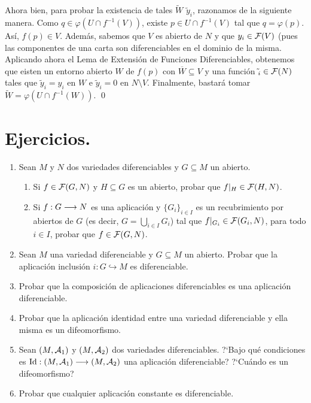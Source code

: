 \documentclass[cursovd_portada.tex]{subfiles}
\begin{document}
\begin{dem}
Ahora bien, para probar la existencia de tales $\tilde{W}$  $\tilde{y}_i$, razonamos de la siguiente manera. Como $q \in φ(U \cap f^{-1}(V))$, existe $p \in U \cap f^{-1}(V)$ tal que $q = φ(p)$. Así, $f(p) \in V$. Además, sabemos que $V$ es abierto de $N$ y que $y_i \in {\cal F}(V)$ (pues las componentes de una carta son diferenciables en el dominio de la misma. Aplicando ahora el Lema de Extensión de Funciones Diferenciables, obtenemos que eisten un entorno abierto $W$ de $f(p)$ con $\overline{W} \subseteq V$ y una función $\tilde{}_i \in {\cal F}(N)$ tales que $\tilde{y}_i = y_i$ en $W$ e $\tilde{y}_i = 0$ en $N \setminus V$. Finalmente, bastará tomar $\tilde{W} = φ(U \cap f^{-1}(W))$.
\qed
\end{dem}
\section{Ejercicios.}
\begin{enumerate}
\item Sean $M$ y $N$ dos variedades diferenciables y $G\subseteq M$ un abierto.
\begin{enumerate}
\item Si $f\in{\cal F}(G,N)$ y $H\subseteq G$ es un abierto, probar que $f|_H\in{\cal F}(H,N)$.
\item Si $f:G\longrightarrow N$ es una aplicación y $\{G_i\}_{i\in I}$ es un recubrimiento por abiertos de $G$ (es decir,
$G=\bigcup_{i\in I}G_i$) tal que $f|_{G_i}\in{\cal F}(G_i,N)$, para todo $i\in I$, probar que $f\in{\cal F}(G,N)$.
\end{enumerate}
\item Sean $M$ una variedad diferenciable y $G\subseteq M$ un
abierto. Probar que la aplicación inclusión
$i:G\hookrightarrow M$ es diferenciable. \item Probar que la
composición de aplicaciones diferenciables es una
aplicación diferenciable. \item Probar que la aplicación
identidad entre una variedad diferenciable y ella misma es un
difeomorfismo. \item Sean $(M,{\cal A}_1)$ y $(M,{\cal A}_2)$ dos
variedades diferenciables. ?`Bajo qué condiciones es ${\rm
Id}: (M,{\cal A}_1)\longrightarrow (M,{\cal A}_2)$ una aplicación
diferenciable? ?`Cuándo es un difeomorfismo? \item Probar que
cualquier aplicación constante es diferenciable. %
\end{enumerate}
\end{document}

